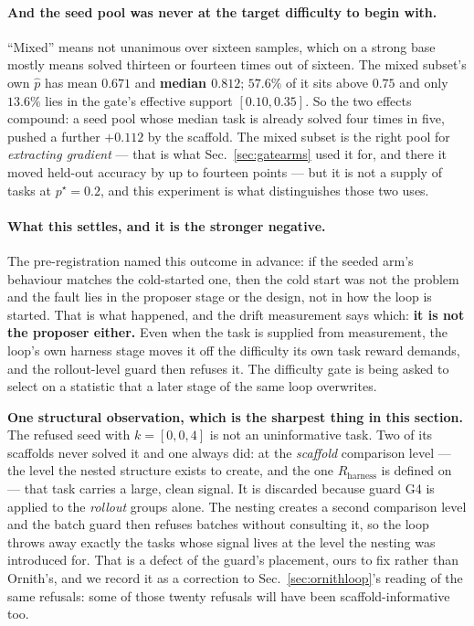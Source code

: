 \paragraph{And the seed pool was never at the target difficulty to begin with.} ``Mixed'' means
not unanimous over sixteen samples, which on a strong base mostly means solved thirteen or
fourteen times out of sixteen. The mixed subset's own $\hat p$ has mean $0.671$ and
\textbf{median $0.812$}; $57.6\%$ of it sits above $0.75$ and only $\mathbf{13.6\%}$ lies in
the gate's effective support $[0.10,0.35]$. So the two effects compound: a seed pool whose
median task is already solved four times in five, pushed a further $+0.112$ by the scaffold.
The mixed subset is the right pool for \emph{extracting gradient} --- that is what
Sec.~\ref{sec:gatearms} used it for, and there it moved held-out accuracy by up to fourteen
points --- but it is not a supply of tasks at $p^\star = 0.2$, and this experiment is what
distinguishes those two uses.

\paragraph{What this settles, and it is the stronger negative.}
The pre-registration named this outcome in advance: if the seeded arm's behaviour matches the
cold-started one, then the cold start was not the problem and the fault lies in the proposer
stage or the design, not in how the loop is started. That is what happened, and the drift
measurement says which: \textbf{it is not the proposer either.} Even when the task is supplied
from measurement, the loop's own harness stage moves it off the difficulty its own task reward
demands, and the rollout-level guard then refuses it. The difficulty gate is being asked to
select on a statistic that a later stage of the same loop overwrites.

\textbf{One structural observation, which is the sharpest thing in this section.} The refused
seed with $k=[0,0,4]$ is not an uninformative task. Two of its scaffolds never solved it and
one always did: at the \emph{scaffold} comparison level --- the level the nested structure
exists to create, and the one $R_{\mathrm{harness}}$ is defined on --- that task carries a
large, clean signal. It is discarded because guard G4 is applied to the \emph{rollout} groups
alone. The nesting creates a second comparison level and the batch guard then refuses batches
without consulting it, so the loop throws away exactly the tasks whose signal lives at the
level the nesting was introduced for. That is a defect of the guard's placement, ours to fix
rather than Ornith's, and we record it as a correction to Sec.~\ref{sec:ornithloop}'s reading
of the same refusals: some of those twenty refusals will have been scaffold-informative too.

